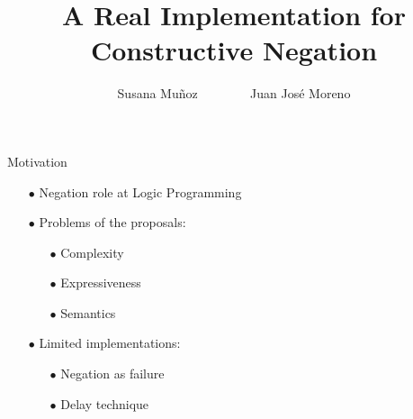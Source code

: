 \documentclass[pdf,slideColor,contemporain]{prosper}
\title{A Real Implementation for Constructive Negation}
\author{Susana Mu\~{n}oz ~~~~~~~ Juan Jos\'{e} Moreno}
\begin{document}
\maketitle

\begin{slide}{Motivation}
     \begin{itemize}
        \item[{\blue $\bullet$}] Negation {\blue role} at Logic Programming
        \item[{\blue $\bullet$}] Problems of the {\blue proposals}:
              \begin{itemize}
                \item[$\bullet$] Complexity
                \item[$\bullet$] Expressiveness
                \item[$\bullet$] Semantics
              \end{itemize}
        \item[{\blue $\bullet$}] Limited {\blue implementations}:
              \begin{itemize}
                \item[$\bullet$] Negation as failure
                \item[$\bullet$] Delay technique
              \end{itemize}
     \end{itemize}
\end{slide}
\end{document}
